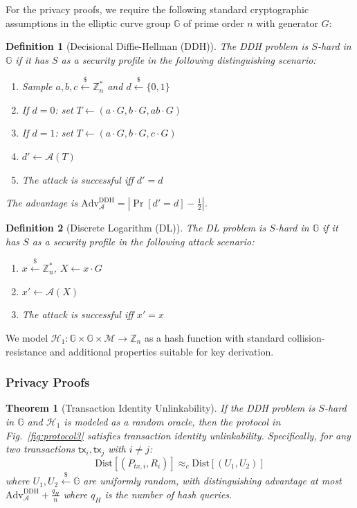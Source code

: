\documentclass{article}
\newtheorem{definition}{Definition}[section]
\newtheorem{theorem}{Theorem}[section]
\begin{document}
For the privacy proofs, we require the following standard cryptographic assumptions in the elliptic curve group $\mathbb{G}$ of prime order $n$ with generator $G$:

\begin{definition}[Decisional Diffie-Hellman (DDH)]
The DDH problem is $S$-hard in $\mathbb{G}$ if it has $S$ as a security profile in the following distinguishing scenario:
\begin{enumerate}
\item Sample $a, b, c \stackrel{\$}{\leftarrow} \mathbb{Z}_n^*$ and $d \stackrel{\$}{\leftarrow} \{0,1\}$
\item If $d = 0$: set $T \leftarrow (a \cdot G, b \cdot G, ab \cdot G)$
\item If $d = 1$: set $T \leftarrow (a \cdot G, b \cdot G, c \cdot G)$
\item $d' \gets \mathcal{A}(T)$
\item The attack is successful iff $d' = d$
\end{enumerate}
The advantage is $\text{Adv}^{\text{DDH}}_{\mathcal{A}} = \left|\Pr[d' = d] - \frac{1}{2}\right|$.
\end{definition}

\begin{definition}[Discrete Logarithm (DL)]
The DL problem is $S$-hard in $\mathbb{G}$ if it has $S$ as a security profile in the following attack scenario:
\begin{enumerate}
\item $x \stackrel{\$}{\leftarrow} \mathbb{Z}_n^*$, $X \leftarrow x \cdot G$
\item $x' \gets \mathcal{A}(X)$
\item The attack is successful iff $x' = x$
\end{enumerate}
\end{definition}

We model $\mathcal{H}_1 \colon \mathbb{G} \times \mathbb{G} \times \mathcal{M} \to \mathbb{Z}_n$ as a hash function with standard collision-resistance and additional properties suitable for key derivation.

\subsubsection{Privacy Proofs}

\begin{theorem}[Transaction Identity Unlinkability]
\label{thm:transaction-unlinkability}
If the DDH problem is $S$-hard in $\mathbb{G}$ and $\mathcal{H}_1$ is modeled as a random oracle, then the protocol in Fig.~\ref{fig:protocol3} satisfies transaction identity unlinkability. Specifically, for any two transactions $\mathsf{tx}_i, \mathsf{tx}_j$ with $i \neq j$:
$$\text{Dist}[(P_{tx,i}, R_i)] \approx_c \text{Dist}[(U_1, U_2)]$$
where $U_1, U_2 \stackrel{\$}{\leftarrow} \mathbb{G}$ are uniformly random, with distinguishing advantage at most $\text{Adv}^{\text{DDH}}_{\mathcal{A}} + \frac{q_H}{n}$ where $q_H$ is the number of hash queries.
\end{theorem}
\end{document}
